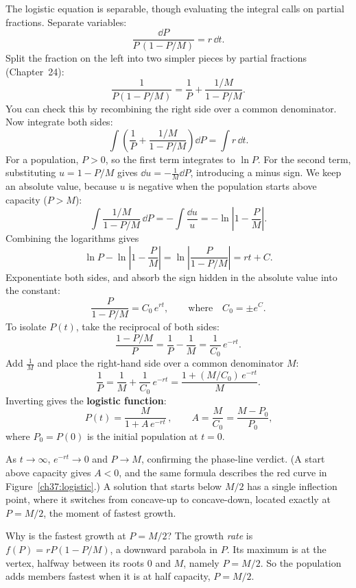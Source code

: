 The logistic equation is separable, though evaluating the integral calls on partial
fractions. Separate variables:
\[
  \frac{\dd P}{P\,(1 - P/M)} = r\,\dd t.
\]
Split the fraction on the left into two simpler pieces by partial fractions
(Chapter~24):
\[
  \frac{1}{P(1-P/M)} = \frac{1}{P} + \frac{1/M}{1-P/M}.
\]
You can check this by recombining the right side over a common denominator. Now
integrate both sides:
\[
  \int\!\left(\frac{1}{P} + \frac{1/M}{1-P/M}\right)\dd P = \int r\,\dd t.
\]
For a population, $P>0$, so the first term integrates to $\ln P$. For the second
term, substituting $u = 1 - P/M$ gives $\dd u = -\frac{1}{M}\dd P$, introducing a
minus sign. We keep an absolute value, because $u$ is negative when the population
starts above capacity ($P>M$):
\[
  \int \frac{1/M}{1-P/M}\,\dd P = -\int \frac{\dd u}{u} = -\ln\left\lvert 1 - \frac{P}{M}\right\rvert.
\]
Combining the logarithms gives
\[
  \ln P - \ln\left\lvert 1 - \frac{P}{M}\right\rvert = \ln\left\lvert\frac{P}{1-P/M}\right\rvert = rt + C.
\]
Exponentiate both sides, and absorb the sign hidden in the absolute value into the
constant:
\[
  \frac{P}{1 - P/M} = C_0\,e^{rt}, \qquad\text{where}\quad C_0 = \pm e^C.
\]
To isolate $P(t)$, take the reciprocal of both sides:
\[
  \frac{1 - P/M}{P} = \frac{1}{P} - \frac{1}{M} = \frac{1}{C_0}\,e^{-rt}.
\]
Add $\frac{1}{M}$ and place the right-hand side over a common denominator $M$:
\[
  \frac{1}{P} = \frac{1}{M} + \frac{1}{C_0}\,e^{-rt} = \frac{1 + (M/C_0)\,e^{-rt}}{M}.
\]
Inverting gives the \textbf{logistic function}:
\[
  \boxed{\,P(t) = \frac{M}{1 + A\,e^{-rt}}\,},\qquad
  A = \frac{M}{C_0} = \frac{M - P_0}{P_0},
\]
where $P_0 = P(0)$ is the initial population at $t=0$.

As $t\to\infty$, $e^{-rt}\to 0$ and $P\to M$, confirming the phase-line verdict. (A
start above capacity gives $A<0$, and the same formula describes the red curve in
Figure~\ref{ch37:logistic}.) A solution that starts below $M/2$ has a single
inflection point, where it switches from concave-up to concave-down, located
exactly at $P=M/2$, the moment of fastest growth.

\begin{walkbox}
Why is the fastest growth at $P=M/2$? The growth \emph{rate} is
$f(P)=rP(1-P/M)$, a downward parabola in $P$. Its maximum is at the vertex, halfway
between its roots $0$ and $M$, namely $P=M/2$. So the population adds members
fastest when it is at half capacity, $P=M/2$.
\end{walkbox}

